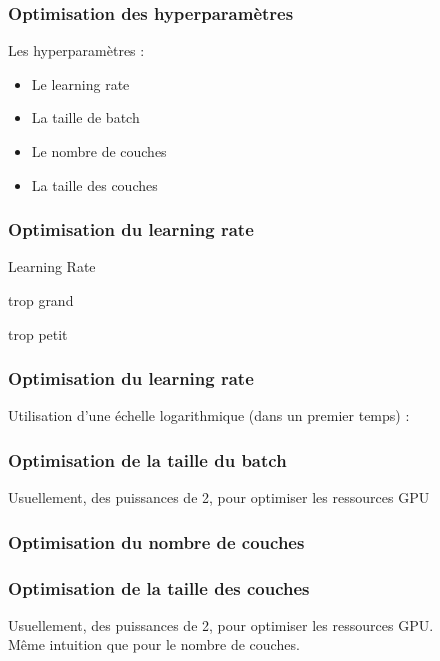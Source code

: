 \begin{frame}
  \frametitle{Optimisation des hyperparamètres}
  \begin{minipage}[l]{0.49\linewidth}
  \end{minipage}\hfill
  \begin{minipage}[l]{0.49\linewidth}
  Les hyperparamètres :
  \begin{itemize}
  \item Le learning rate
  \item La taille de batch
  \item Le nombre de couches
  \item La taille des couches
  \end{itemize}
  \end{minipage}\hfill
\end{frame}

\begin{frame}
  \frametitle{Optimisation du learning rate}
  \begin{center}Learning Rate\end{center}
  \begin{minipage}[l]{0.49\linewidth}
    \begin{center}trop grand\end{center}
  \end{minipage}\hfill
  \begin{minipage}[l]{0.49\linewidth}
    \begin{center}trop petit\end{center}
  \end{minipage}\hfill
\end{frame}

\begin{frame}
  \frametitle{Optimisation du learning rate}
  Utilisation d'une échelle logarithmique (dans un premier temps) :
\end{frame}

\begin{frame}
  \frametitle{Optimisation de la taille du batch}
  Usuellement, des puissances de 2, pour optimiser les ressources GPU
\end{frame}

\begin{frame}
  \frametitle{Optimisation du nombre de couches}
\end{frame}

\begin{frame}
  \frametitle{Optimisation de la taille des couches}
  Usuellement, des puissances de 2, pour optimiser les ressources GPU. \\
  Même intuition que pour le nombre de couches.
\end{frame}
